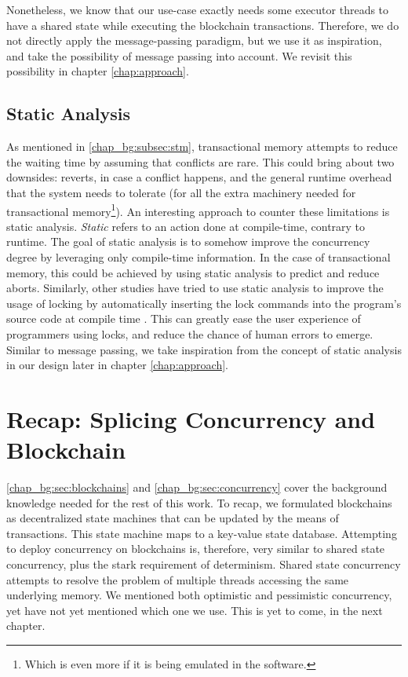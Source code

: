 Nonetheless, we know that our use-case exactly needs some executor threads to have a shared state
while executing the blockchain transactions. Therefore, we do not directly apply the message-passing
paradigm, but we use it as inspiration, and take the possibility of message passing into account. We
revisit this possibility in chapter \ref{chap:approach}.

\subsection{Static Analysis}

As mentioned in \ref{chap_bg:subsec:stm}, transactional memory attempts to reduce the waiting time
by assuming that conflicts are rare. This could bring about two downsides: reverts, in case a
conflict happens, and the general runtime overhead that the system needs to tolerate (for all the
extra machinery needed for transactional memory\footnote{Which is even more if it is being emulated
in the software.}). An interesting approach to counter these limitations is static analysis.
\textit{Static} refers to an action done at compile-time, contrary to runtime. The goal of static
analysis is to somehow improve the concurrency degree by leveraging only compile-time information.
In the case of transactional memory, this could be achieved by using static analysis to predict and
reduce aborts\cite{diasEfficientCorrectTransactional}. Similarly, other studies have tried to use
static analysis to improve the usage of locking by automatically inserting the lock commands into
the program's source code at compile time \cite{cheremInferringLocksAtomic2007}. This can greatly
ease the user experience of programmers using locks, and reduce the chance of human errors to
emerge. Similar to message passing, we take inspiration from the concept of static analysis in our
design later in chapter \ref{chap:approach}.

\section{Recap: Splicing Concurrency and Blockchain}

\ref{chap_bg:sec:blockchains} and \ref{chap_bg:sec:concurrency} cover the background knowledge
needed for the rest of this work. To recap, we formulated blockchains as decentralized state
machines that can be updated by the means of transactions. This state machine maps to a key-value
state database. Attempting to deploy concurrency on blockchains is, therefore, very similar to
shared state concurrency, plus the stark requirement of determinism. Shared state concurrency
attempts to resolve the problem of multiple threads accessing the same underlying memory. We
mentioned both optimistic and pessimistic concurrency, yet have not yet mentioned which one we use.
This is yet to come, in the next chapter.
